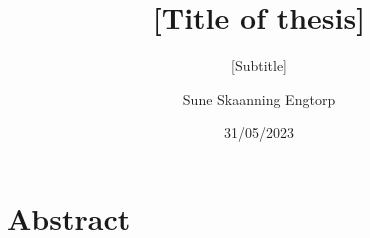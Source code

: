 \documentclass[12pt]{article}
\author{Sune Skaanning Engtorp}
\title{[Title of thesis]}
\subtitle{[Subtitle]}
\date{31/05/2023}
\begin{document}
\maketitle

\onehalfspacing

\newpage

\tableofcontents
\newpage

{\selectfont

\section{Abstract}

\section{}

}
\end{document}
